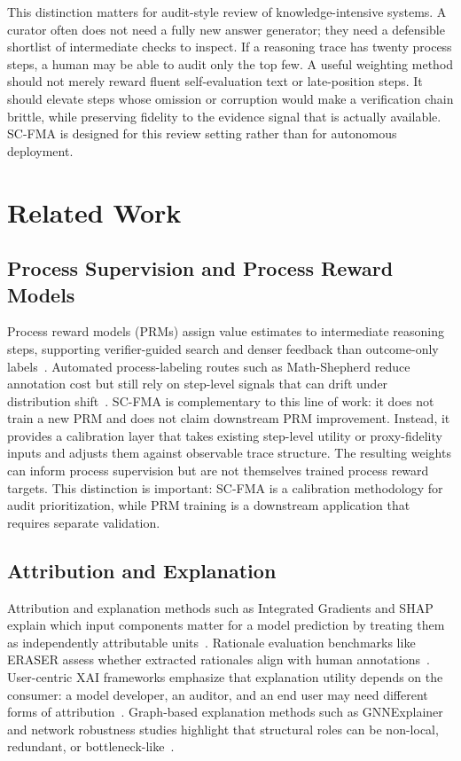 \documentclass[a4paper,fleqn]{cas-sc}
\begin{document}
This distinction matters for audit-style review of knowledge-intensive systems. A curator often does not need a fully new answer generator; they need a defensible shortlist of intermediate checks to inspect. If a reasoning trace has twenty process steps, a human may be able to audit only the top few. A useful weighting method should not merely reward fluent self-evaluation text or late-position steps. It should elevate steps whose omission or corruption would make a verification chain brittle, while preserving fidelity to the evidence signal that is actually available. SC-FMA is designed for this review setting rather than for autonomous deployment.

\section{Related Work}

\subsection{Process Supervision and Process Reward Models}

Process reward models (PRMs) assign value estimates to intermediate reasoning steps, supporting verifier-guided search and denser feedback than outcome-only labels~\cite{lightman2023verify,uesato2022solving,cobbe2021training}. Automated process-labeling routes such as Math-Shepherd reduce annotation cost but still rely on step-level signals that can drift under distribution shift~\cite{wang2024mathshepherd,zheng2024processbench}. SC-FMA is complementary to this line of work: it does not train a new PRM and does not claim downstream PRM improvement. Instead, it provides a calibration layer that takes existing step-level utility or proxy-fidelity inputs and adjusts them against observable trace structure. The resulting weights can inform process supervision but are not themselves trained process reward targets. This distinction is important: SC-FMA is a calibration methodology for audit prioritization, while PRM training is a downstream application that requires separate validation.

\subsection{Attribution and Explanation}

Attribution and explanation methods such as Integrated Gradients and SHAP explain which input components matter for a model prediction by treating them as independently attributable units~\cite{sundararajan2017axiomatic,lundberg2017unified}. Rationale evaluation benchmarks like ERASER assess whether extracted rationales align with human annotations~\cite{deyoung2020eraser}. User-centric XAI frameworks emphasize that explanation utility depends on the consumer: a model developer, an auditor, and an end user may need different forms of attribution~\cite{kaplan2024xai}. Graph-based explanation methods such as GNNExplainer and network robustness studies highlight that structural roles can be non-local, redundant, or bottleneck-like~\cite{ying2019gnnexplainer,albert2000error,newman2010networks,liu2025knowledgereasoning}.
\end{document}
